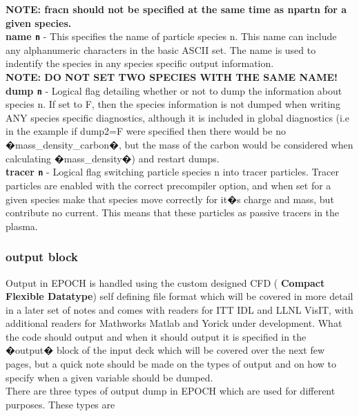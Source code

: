 \documentclass[12pt]{article}
\newcommand{\emphtext}{\color{warwickdark} \fontfamily{phv}\selectfont\Large\bf}
\newcommand{\inlineemph}{\color{warwicklight} \bf}
\newcommand{\inlinecode}[1]{{\color{warwickred} \bf\texttt{#1}}}
\newcommand{\EPOCH}{{\color{warwickdark}\fontfamily{phv}\selectfont EPOCH} }
\begin{document}
{\emphtext NOTE: fracn should not be specified at the same time as npartn for a
given species.}\\

{\emphtext name\inlinecode{n}} - This specifies the name of particle species
n. This name can include any alphanumeric characters in the basic ASCII
set. The name is used to indentify the species in any species specific output
information. \\

{\emphtext NOTE: DO NOT SET TWO SPECIES WITH THE SAME NAME!}\\

{\emphtext dump\inlinecode{n}} - Logical flag detailing whether or not to dump
the information about species n. If set to F, then the species information is
not dumped when writing ANY species specific diagnostics, although it is
included in global diagnostics (i.e in the example if dump2=F were specified
then there would be no �mass\_density\_carbon�, but the mass of the carbon
would be considered when calculating �mass\_density�) and restart dumps.\\

{\emphtext tracer\inlinecode{n}} - Logical flag switching particle species n
into tracer particles. Tracer particles are enabled with the correct
precompiler option, and when set for a given species make that species move
correctly for it�s charge and mass, but contribute no current. This means that
these particles as passive tracers in the plasma.\\

\pagebreak

\subsubsection{{\inlineemph output} block}
Output in \EPOCH is handled using the custom designed CFD ({\inlineemph Compact
Flexible Datatype}) self defining file format which will be covered in more
detail in a later set of notes and comes with readers for ITT IDL and LLNL
VisIT, with additional readers for Mathworks Matlab and Yorick under
development. What the code should output and when it should output it is
specified in the �output� block of the input deck which will be covered over
the next few pages, but a quick note should be made on the types of output and
on how to specify when a given variable should be dumped.\\

There are three types of output dump in \EPOCH which are used for different
purposes. These types are\\
\end{document}
